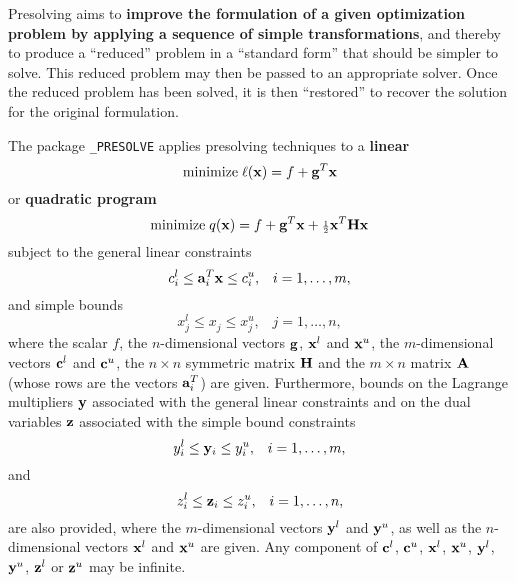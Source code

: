 \documentclass{galahad}
\newcommand{\packagename}{PRESOLVE}
\newcommand{\fullpackagename}{\libraryname\_\packagename}
\begin{document}
\galheader


\galsummary

Presolving aims to {\bf improve the formulation of a given optimization
  problem by applying a sequence of simple transformations}, and thereby
to produce a ``reduced'' problem in a ``standard form'' that should be
simpler to solve.  This reduced problem may then be passed to an
appropriate solver.  Once the reduced problem has been solved, it is
then ``restored'' to recover the solution for the original formulation.

The package {\tt \fullpackagename} applies presolving techniques to a 
{\bf linear}
\begin{equation}\label{objlp}
{\rm minimize}\;  \ell({\mathbf{x}}) = f + {\mathbf{g}}^T {\mathbf{x}}
\end{equation}
or {\bf quadratic program}
\begin{equation}\label{objqp}
{\rm minimize}\;  q({\mathbf{x}}) = f + {\mathbf{g}}^T {\mathbf{x}} + {\scriptstyle \frac{1}{2}} {\mathbf{x}}^T {\mathbf{H}} {\mathbf{x}}
\end{equation}
subject to the general linear constraints
\begin{equation}\label{gcqp}
c_{i}^{l}  \leq  {\mathbf{a}}_{i}^{T}{\mathbf{x}}  \leq  c_{i}^{u}, \;\;\; i = 1, \ldots , m,
\end{equation}
and simple bounds
\begin{equation}\label{vbqp}
x_{j}^{l}  \leq  x_{j}^{ } \leq  x_{j}^{u} , \;\;\; j = 1, \ldots , n,
\end{equation}
where the scalar $f$, the $n$-dimensional vectors ${\mathbf{g}}$, ${\mathbf{x}}^l$ and
${\mathbf{x}}^u$, the $m$-dimensional vectors ${\mathbf{c}}^l$ and ${\mathbf{c}}^u$,
the $n \times n$ symmetric matrix ${\mathbf{H}}$ and the $m \times n$ matrix ${\mathbf{A}}$
(whose rows are the vectors ${\mathbf{a}}_{i}^T$) are
given. Furthermore, bounds on the Lagrange multipliers ${\mathbf{y}}$ associated with
the general linear constraints and on the dual variables ${\mathbf{z}}$ associated
with the simple bound constraints
\[
y_{i}^{l}  \leq  {\mathbf{y}}_{i}  \leq  y_{i}^{u}, \;\;\;  i = 1, \ldots , m,
\]
and
\[
z_{i}^{l}  \leq  {\mathbf{z}}_{i}  \leq  z_{i}^{u}, \;\;\;  i = 1, \ldots , n,
\]
are also provided, where the $m$-dimensional vectors ${\mathbf{y}}^l$ and
${\mathbf{y}}^u$, as well as the $n$-dimensional vectors ${\mathbf{x}}^l$ and ${\mathbf{x}}^u$
are given.  Any component of ${\mathbf{c}}^l$, ${\mathbf{c}}^u$, ${\mathbf{x}}^l$, ${\mathbf{x}}^u$,
${\mathbf{y}}^l$, ${\mathbf{y}}^u$, ${\mathbf{z}}^l$ or ${\mathbf{z}}^u$ may be infinite.

\end{document}
